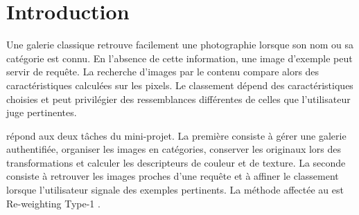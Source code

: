 \section{Introduction}
Une galerie classique retrouve facilement une photographie lorsque son nom ou sa catégorie est connu. En l'absence de cette information, une image d'exemple peut servir de requête. La recherche d'images par le contenu compare alors des caractéristiques calculées sur les pixels. Le classement dépend des caractéristiques choisies et peut privilégier des ressemblances différentes de celles que l'utilisateur juge pertinentes.

\projet{} répond aux deux tâches du mini-projet. La première consiste à gérer une galerie authentifiée, organiser les images en catégories, conserver les originaux lors des transformations et calculer les descripteurs de couleur et de texture. La seconde consiste à retrouver les images proches d'une requête et à affiner le classement lorsque l'utilisateur signale des exemples pertinents. La méthode affectée au \groupe{} est Re-weighting Type-1 \cite{renuka2016}.
